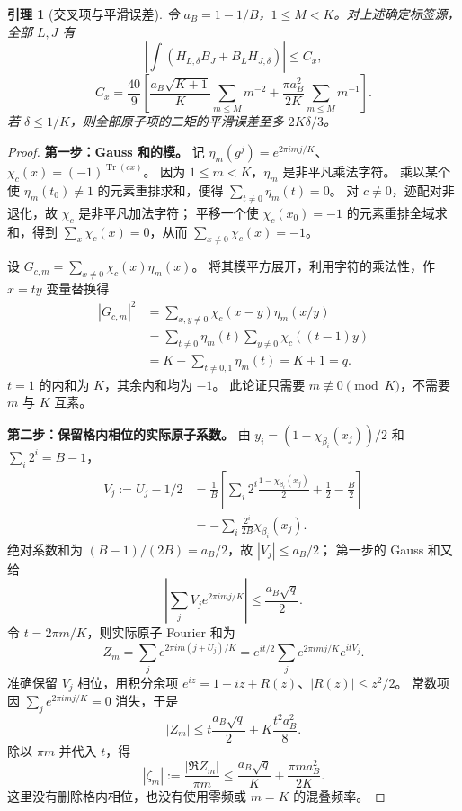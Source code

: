 \documentclass[UTF8,a4paper,11pt,fontset=fandol]{ctexart}
\newtheorem{lemma}{引理}[section]
\theoremstyle{remark}
\begin{document}
\begin{lemma}[交叉项与平滑误差]\label{lem:papercross}
令 $a_B=1-1/B$，$1\le M<K$。对上述确定标签源，全部 $L,J$ 有
\[
 \left|\int(H_{L,\delta}B_J+B_LH_{J,\delta})\right|\le C_x,
\]
\[
 C_x=\frac{40}{9}\left[
 \frac{a_B\sqrt{K+1}}K\sum_{m\le M}m^{-2}
 +\frac{\pi a_B^2}{2K}\sum_{m\le M}m^{-1}\right].
\]
若 $\delta\le1/K$，则全部原子项的二矩的平滑误差至多 $2K\delta/3$。
\end{lemma}
\begin{proof}
\textbf{第一步：Gauss 和的模。}
记 $\eta_m(g^j)=e^{2\pi imj/K}$、$\chi_c(x)=(-1)^{\operatorname{Tr}(cx)}$。
因为 $1\le m<K$，$\eta_m$ 是非平凡乘法字符。
乘以某个使 $\eta_m(t_0)\ne1$ 的元素重排求和，便得
$\sum_{t\ne0}\eta_m(t)=0$。
对 $c\ne0$，迹配对非退化，故 $\chi_c$ 是非平凡加法字符；
平移一个使 $\chi_c(x_0)=-1$ 的元素重排全域求和，得到
$\sum_x\chi_c(x)=0$，从而 $\sum_{x\ne0}\chi_c(x)=-1$。

设 $G_{c,m}=\sum_{x\ne0}\chi_c(x)\eta_m(x)$。
将其模平方展开，利用字符的乘法性，作 $x=ty$ 变量替换得
\begin{align*}
 |G_{c,m}|^2
 &=\sum_{x,y\ne0}\chi_c(x-y)\eta_m(x/y)\\
 &=\sum_{t\ne0}\eta_m(t)\sum_{y\ne0}\chi_c((t-1)y)\\
 &=K-\sum_{t\ne0,1}\eta_m(t)=K+1=q.
\end{align*}
$t=1$ 的内和为 $K$，其余内和均为 $-1$。
此论证只需要 $m\not\equiv0\pmod K$，不需要 $m$ 与 $K$ 互素。

\textbf{第二步：保留格内相位的实际原子系数。}
由 $y_i=(1-\chi_{\beta_i}(x_j))/2$ 和 $\sum_i2^i=B-1$，
\begin{align*}
 V_j:=U_j-1/2
 &=\frac1B\left[\sum_i2^i\frac{1-\chi_{\beta_i}(x_j)}2
 +\frac12-\frac B2\right]\\
 &=-\sum_i\frac{2^i}{2B}\chi_{\beta_i}(x_j).
\end{align*}
绝对系数和为 $(B-1)/(2B)=a_B/2$，故 $|V_j|\le a_B/2$；
第一步的 Gauss 和又给
\[
 \left|\sum_jV_je^{2\pi imj/K}\right|
 \le\frac{a_B\sqrt q}{2}.
\]
令 $t=2\pi m/K$，则实际原子 Fourier 和为
\[
 Z_m=\sum_je^{2\pi im(j+U_j)/K}
 =e^{it/2}\sum_je^{2\pi imj/K}e^{itV_j}.
\]
准确保留 $V_j$ 相位，用积分余项
$e^{iz}=1+iz+R(z)$、$|R(z)|\le z^2/2$。
常数项因 $\sum_je^{2\pi imj/K}=0$ 消失，于是
\[
 |Z_m|\le t\frac{a_B\sqrt q}{2}+K\frac{t^2a_B^2}{8}.
\]
除以 $\pi m$ 并代入 $t$，得
\[
 |\zeta_m|:=\frac{|\Re Z_m|}{\pi m}
 \le\frac{a_B\sqrt q}{K}+\frac{\pi m a_B^2}{2K}.
\]
这里没有删除格内相位，也没有使用零频或 $m=K$ 的混叠频率。


\end{proof}
\end{document}
